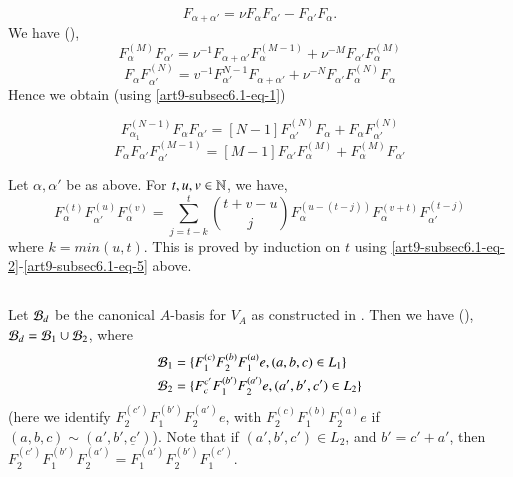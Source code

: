 \setcounter{equation}{0}
\begin{equation}\label{art9-subsec6.1-eq-1}
F_{\alpha + \alpha'} = \nu F_{\alpha}F_{\alpha'}-F_{\alpha'}F_{\alpha}.
\end{equation}
We have (\cite{art9-keyL1}),
\begin{equation}\label{art9-subsec6.1-eq-2}
F_{\alpha}^{(M)}F_{\alpha'} = \nu^{-1}F_{\alpha + \alpha'}F_{\alpha}^{(M-1)}+ \nu^{-M}F_{\alpha'}F_{\alpha}^{(M)}
\end{equation}
\begin{equation}\label{art9-subsec6.1-eq-3}
F_{\alpha}F_{\alpha'}^{(N)} = v^{-1}F_{\alpha'}^{N-1}F_{\alpha+\alpha'}+ \nu^{-N}F_{\alpha'}F_{\alpha}^{(N)}F_{\alpha}
\end{equation}
Hence we obtain (using \eqref{art9-subsec6.1-eq-1})

\begin{equation}\label{art9-subsec6.1-eq-4}
F_{\alpha_{1}}^{(N-1)}F_{\alpha}F_{\alpha'} = [N-1]F_{\alpha'}^{(N)}F_{\alpha} + F_{\alpha}F_{\alpha'}^{(N)}
\end{equation}
\begin{equation}\label{art9-subsec6.1-eq-5}
F_{\alpha}F_{\alpha'}F_{\alpha'}^{(M-1)} = [M-1]F_{\alpha'}F_{\alpha}^{(M)} + F_{\alpha}^{(M)}F_{\alpha'}
\end{equation}


\setcounter{lemma}{1}
\begin{lemma}\label{art9-lemma-6.2}
Let $\alpha, \alpha'$ be as above. For $t, u, v \in \mathbb{N}$, we have,
$$
F_{\alpha}^{(t)}F_{\alpha'}^{(u)}F_{\alpha}^{(v)} = \sum\limits_{j=t-k}^{t}\binom{t+v-u}{j} F_{\alpha}^{(u-(t-j))}F_{\alpha}^{(v+t)}F_{\alpha'}^{(t-j)}
$$
where $k =min(u, t)$. This is proved by induction on $t$ using \eqref{art9-subsec6.1-eq-2}-\eqref{art9-subsec6.1-eq-5} above.
\end{lemma}

\setcounter{subsection}{2}
\subsection{}\label{art9-subsec-6.3}
Let $\mathcal{B}_{d}$ be the canonical $A$-basis for $V_{A}$ as constructed in \cite{art9-keyL2}. Then we have (\cite{art9-keyL3}),
$\mathcal{B}_{d}= \mathcal{B}_{1} \cup \mathcal{B}_{2}$, where
\begin{align*}
\mathcal{B}_{1} &= \{F_{1}^{(c)} F_{2}^{(b)}F_{1}^{(a)}e,(a,b,c) \in L_{1}\}\\
\mathcal{B}_{2} &= \{F_{c}^{c'}F_{1}^{(b')}F_{2}^{(a')}e, (a',b', c') \in L_{2}\}
\end{align*}
(here we identify $F_{2}^{(c')}F_{1}^{(b')}F_{2}^{(a')}e$, with $F_{2}^{(c)} F_{1}^{(b)}F_{2}^{(a)} e$ if $(a,b,c) \sim (a',b', \underline{c}')$). Note that if $(a',b',c')\in L_{2}$, and $b' =c' + a'$, then $F_{2}^{(c')}F_{1}^{(b')}F_{2}^{(a')} = F_{1}^{(a')}F_{2}^{(b')}F_{1}^{(c')}$.

